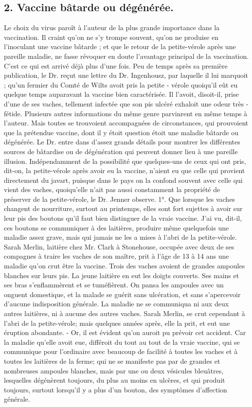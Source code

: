 \subsection{2. Vaccine bâtarde ou dégénérée.}
Le choix du virus paroît à l'auteur de la plus grande importance dans la vaccination. Il craint qu'on ne s'y trompe souvent, qu'on ne produise en l'inoculant une vaccine bâtarde ; et que le retour de la petite-vérole après une pareille maladie, ne fasse révoquer en doute l'avantage principal de la vaccination. C'est ce qui est arrivé déjà plus d'une fois. Peu de temps après sa première publication, le Dr. reçut une lettre du Dr. Ingenhousz, par laquelle il lui marquoit ; qu'un fermier du Comté de Wilts avoit pris la petite - vérole quoiqu'il eût eu quelque temps auparavant la vaccine bien caractérisée. Il l'avoit, disoit-il, prise d'une de ses vaches, tellement infectée que son pis ulcéré exhaloit une odeur très - fétide. Plusieurs autres informations du même genre parvinrent en même temps à l'auteur. Mais toutes se trouvoient accompagnées de circonstances, qui prouvoient que la prétendue vaccine, dont il y étoit question étoit une maladie bâtarde ou dégénérée.
Le Dr. entre dans d'assez grands détails pour montrer les différentes sources de bâtardise ou de dégénération qui peuvent donner lieu à une pareille illusion. Indépendamment\setcounter{page}{269} de la possibilité que quelques-uns de ceux qui ont pris, dit-on, la petite-vérole après avoir eu la vaccine, n'aient eu que celle qui provient directement du javart, puisque dans le pays on la confond souvent avec celle qui vient des vaches, quoiqu'elle n'ait pas aussi constamment la propriété de préserver de la petite-vérole, le Dr. Jenner observe.
1°. Que lorsque les vaches changent de nourriture, surtout au printemps, elles sont fort sujettes à avoir sur leur pis des boutons qu'il faut bien distinguer de la vraie vaccine. J'ai vu, dit-il, ces boutons se communiquer à des laitières, produire même quelquefois une maladie assez grave, mais qui jamais ne les a mises à l'abri de la petite-vérole. Sarah Merlin, laitière chez Mr. Clark à Stonehouse, occupée avec deux de ses compagnes à traire les vaches de son maître, prit à l'âge de 13 à 14 ans une maladie qu'on crut être la vaccine. Trois des vaches avoient de grandes ampoules blanches sur leurs pis. La jeune laitière en eut les doigts couverts. Ses mains et ses bras s'enflammèrent et se tuméfièrent. On pansa les ampoules avec un onguent domestique, et la malade se guérit sans ulcération, et sans s'apercevoir d'aucune indisposition générale. La maladie ne se communiqua ni aux deux autres laitières, ni\setcounter{page}{270} à aucune des autres vaches. Sarah Merlin, se crut cependant à l'abri de la petite-vérole; mais quelques années après, elle la prit, et eut une éruption abondante. - Or, il est évident qu'on auroit pu prévoir cet accident. Car la maladie qu'elle avoit eue, différoit du tout au tout de la vraie vaccine, qui se communique pour l'ordinaire avec beaucoup de facilité à toutes les vaches et à toutes les laitières de la ferme; qui ne se manifeste pas par de grandes et nombreuses ampoules blanches, mais par une ou deux vésicules bleuâtres, lesquelles dégénèrent toujours, du plus au moins en ulcères, et qui produit toujours, surtout lorsqu'il y a plus d'un bouton, des symptômes d'affection générale.
